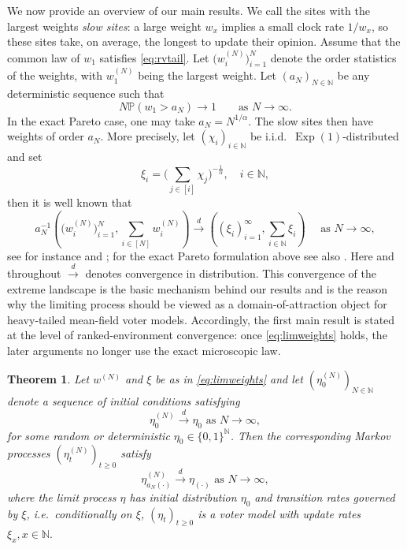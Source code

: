\documentclass[11pt,a4paper]{scrartcl}
\numberwithin{equation}{section}
\theoremstyle{plain}
\newtheorem{theorem}{Theorem}[section]
\theoremstyle{definition}
\theoremstyle{remark}
\newcommand{\bN}{\ensuremath{\mathbb{N}}}
\newcommand{\bP}{\ensuremath{\mathbb{P}}}
\begin{document}
We now provide an overview of our main results. We call the sites with the largest weights \emph{slow sites}: a large weight $w_x$ implies a small clock rate $1/w_x$, so these sites take, on average, the longest to update their opinion.
Assume that the common law of $w_1$ satisfies \eqref{eq:rvtail}.
Let $\big(w_i^{(N)}\big)_{i=1}^N$ denote the order statistics of the weights, with $w_1^{(N)}$ being the largest weight. Let $(a_N)_{N\in\bN}$ be any deterministic sequence such that
\begin{equation}\label{eq:aN}
N\bP(w_1>a_N)\longrightarrow 1\qquad \text{as }N\to\infty.
\end{equation}
In the exact Pareto case, one may take $a_N=N^{1/\alpha}$. The slow sites then have weights of order $a_N$. More precisely, let $(\chi_i)_{i\in\bN}$ be i.i.d.\ $\operatorname{Exp}(1)$-distributed and set
$$\xi_i=\Big(\sum_{j\in[i]} \chi_j\Big)^{-\frac{1}{\alpha}}, \quad i\in\bN,$$
then it is well known that
\begin{equation}\label{eq:limweights}
	a_N^{-1}\left(\big(w_i^{(N)}\big)_{i=1}^N, \sum_{i\in[N]}w_i^{(N)} \right) \overset{d}{\longrightarrow} \left((\xi_i)_{i=1}^{\infty}, \sum_{i\in\mathbb{N}}\xi_i\right)\quad \text{ as }N\to\infty,
\end{equation}
see for instance \cite[Chapter 5]{Resni08} and \cite[Section 2.3]{LeadbLindgRootz83}; for the exact Pareto formulation above see also \cite[Theorem 2.33]{Hofst17}. Here and throughout $ \overset{d}{\to}$ denotes convergence in distribution. This convergence of the extreme landscape is the basic mechanism behind our results and is the reason why the limiting process should be viewed as a domain-of-attraction object for heavy-tailed mean-field voter models. Accordingly, the first main result is stated at the level of ranked-environment convergence: once \eqref{eq:limweights} holds, the later arguments no longer use the exact microscopic law.
\begin{theorem}\label{thm:limitvotermodel}
Let $w^{(N)}$ and $\xi$ be as in \eqref{eq:limweights} and let $(\eta_0^{(N)})_{N\in\bN}$ denote a sequence of initial conditions satisfying
\[
\eta_0^{(N)} \overset{d}{\longrightarrow} \eta_0 \text{ as }N\to\infty,
\]
for some random or deterministic $\eta_0\in\{0,1\}^{\bN}$. Then the corresponding Markov processes $(\eta_t^{(N)})_{t\geq 0}$ satisfy
\[
\eta^{(N)}_{a_N(\cdot)} \overset{d}{\longrightarrow} \eta_{(\cdot)} \text{ as }N\to\infty,
\]
where the limit process $\eta$ has initial distribution $\eta_0$ and transition rates governed by $\xi$, i.e.\ conditionally on $\xi$, $(\eta_t)_{t\geq 0}$ is a voter model with update rates $\xi_x,x\in\bN.$
\end{theorem}
\end{document}
